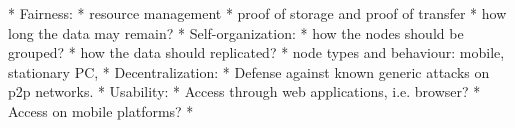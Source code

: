 * Fairness:
  * resource management
  * proof of storage and proof of transfer
  * how long the data may remain?
* Self-organization:
  * how the nodes should be grouped?
  * how the data should replicated?
  * node types and behaviour: mobile, stationary PC,
* Decentralization:
  * Defense against known generic attacks on p2p networks.
* Usability:
  * Access through web applications, i.e. browser?
  * Access on mobile platforms?
  *
